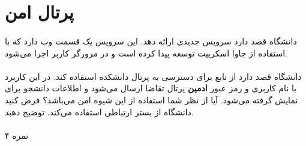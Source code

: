 \documentclass[../main.tex]{subfiles}
\begin{document}
\section{پرتال امن}

\paragraph{}
دانشگاه قصد دارد سرویس جدیدی ارائه دهد.
این سرویس یک قسمت وب دارد که با استفاده از جاوا اسکریپت توسعه پیدا
کرده است و در مرورگر کاربر اجرا می‌شود.

\paragraph{}
دانشگاه قصد دارد از تابع  برای دسترسی به پرتال دانشکده استفاده کند.
در این کاربرد با نام کاربری و رمز عبور \textbf{ادمین} پرتال تقاضا ارسال می‌شود و اطلاعات دانشجو برای نمایش گرفته می‌شود.
آیا از نظر شما استفاده از این شیوه امن می‌باشد؟ فرض کنید دانشگاه از بستر ارتباطی  استفاده می‌کند.
توضیح دهید.

\paragraph{}
۴ نمره

\end{document}
